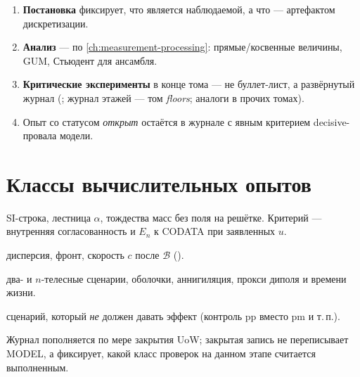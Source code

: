 \begin{enumerate}[label=\textbf{L\arabic*:},leftmargin=*]
\item \textbf{Постановка} фиксирует, что является наблюдаемой, а что --- артефактом дискретизации.
\item \textbf{Анализ} --- по \cref{ch:measurement-processing}: прямые/косвенные величины, GUM, Стьюдент для ансамбля.
\item \textbf{Критические эксперименты} в конце тома --- не буллет-лист, а развёрнутый журнал
  (; журнал этажей --- том \emph{floors}; аналоги в прочих томах).
\item Опыт со статусом \emph{открыт} остаётся в журнале с явным критерием decisive-провала модели.
\end{enumerate}

\section{Классы вычислительных опытов}
\label{sec:lab-classes}

\begin{description}[style=nextline,leftmargin=3.4cm]
\item[\textbf{Алгебра / замыкание}]
  SI-строка, лестница $\alpha$, тождества масс без поля на решётке.
  Критерий --- внутренняя согласованность и $E_n$ к CODATA при заявленных $u$.
\item[\textbf{Макро-поле на карте}]
  дисперсия, фронт, скорость $c$ после $\mathcal{B}$ ().
\item[\textbf{Составной узел на этаже}]
  два- и $n$-телесные сценарии, оболочки, аннигиляция, прокси диполя и времени жизни.
\item[\textbf{Отрицательные / контроль}]
  сценарий, который \emph{не} должен давать эффект (контроль pp вместо pm и т.\,п.).
\end{description}

Журнал пополняется по мере закрытия UoW; закрытая запись не переписывает MODEL,
а фиксирует, какой класс проверок на данном этапе считается выполненным.
